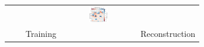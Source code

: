 \documentclass[draft]{agujournal2019}
\begin{document}
\begin{figure}[H]
\small
\begin{center}
\setlength{\tabcolsep}{1pt}
\begin{tabular}{ccccc}
 &&
&\hspace{-30mm} \includegraphics[trim={8mm 7cm 22mm 0},clip,width=3.0cm,height=0.7cm]{figures/plots/horizontal_cbar_vort.png} &\\
\hspace{0mm} &&
\hspace{-30mm} Training  
\hspace{3mm}  & 
 & 
\hspace{-30mm} Reconstruction \\



\end{tabular}
\end{center}
\end{figure}
\end{document}
